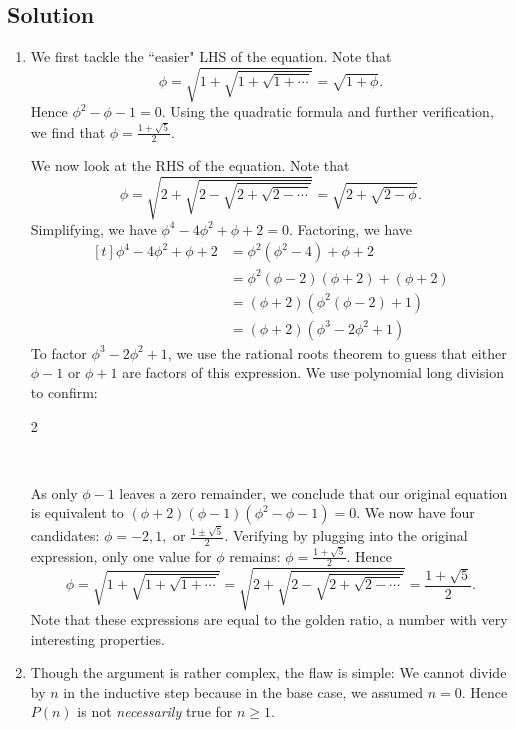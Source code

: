 \documentclass{article}
\begin{document}
\subsection*{Solution}
    \begin{enumerate}
        \item We first tackle the ``easier" LHS of the equation. Note that $$\phi = \sqrt{1 + \sqrt{1+ \sqrt{1 + \cdots}}} = \sqrt{1 + \phi}.$$ Hence $\phi^{2} - \phi - 1 = 0$. Using the quadratic formula and further verification, we find that $\phi = \frac{1 + \sqrt{5}}{2}$.
        
        We now look at the RHS of the equation. Note that $$\phi = \sqrt{2 + \sqrt{2 - \sqrt{2 + \sqrt{2 - \cdots}}}} = \sqrt{2 + \sqrt{2 - \phi}}.$$ Simplifying, we have $\phi^{4} - 4\phi^{2} + \phi + 2 = 0$. Factoring, we have
            $$\begin{aligned}[t]
                \phi^{4} - 4\phi^{2} + \phi + 2 &= \phi^{2}(\phi^{2} - 4) + \phi + 2 \\
                &= \phi^{2}(\phi - 2)(\phi + 2) + (\phi + 2) \\
                &= (\phi + 2)(\phi^{2}(\phi - 2) + 1) \\
                &= (\phi + 2)(\phi^{3} - 2\phi^{2} + 1)
            \end{aligned}$$
        To factor $\phi^{3} - 2\phi^{2} + 1$, we use the rational roots theorem to guess that either $\phi - 1$ or $\phi + 1$ are factors of this expression. We use polynomial long division to confirm:
        
        \begin{multicols}{2}
            \begin{center}
                 \\
                \hspace{-3cm} 
            \end{center}
        \end{multicols}
        
        As only $\phi - 1$ leaves a zero remainder, we conclude that our original equation is equivalent to $(\phi + 2)(\phi - 1)(\phi^{2} - \phi - 1) = 0$. We now have four candidates: $\phi = -2, 1, \text{ or } \frac{1 \pm \sqrt{5}}{2}$. Verifying by plugging into the original expression, only one value for $\phi$ remains: $\phi = \frac{1 + \sqrt{5}}{2}$. Hence $$\phi = \sqrt{1 + \sqrt{1+ \sqrt{1 + \cdots}}} = \sqrt{2 + \sqrt{2 - \sqrt{2 + \sqrt{2 - \cdots}}}} = \frac{1 + \sqrt{5}}{2}.$$ Note that these expressions are equal to the golden ratio, a number with very interesting properties.
        \item Though the argument is rather complex, the flaw is simple: We cannot divide by $n$ in the inductive step because in the base case, we assumed $n = 0$. Hence $P(n)$ is not \textit{necessarily} true for $n \ge 1$.
        

\end{enumerate}
\end{document}
